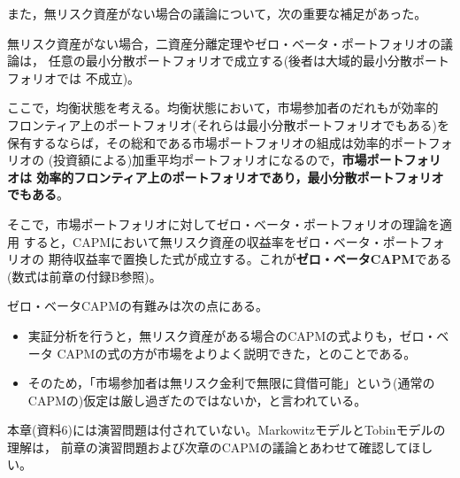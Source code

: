 また，無リスク資産がない場合の議論について，次の重要な補足があった。

\begin{keypoint}[均衡状態と市場ポートフォリオ]
無リスク資産がない場合，二資産分離定理やゼロ・ベータ・ポートフォリオの議論は，
任意の最小分散ポートフォリオで成立する(後者は大域的最小分散ポートフォリオでは
不成立)。

ここで，均衡状態を考える。均衡状態において，市場参加者のだれもが効率的
フロンティア上のポートフォリオ(それらは最小分散ポートフォリオでもある)を
保有するならば，その総和である市場ポートフォリオの組成は効率的ポートフォリオの
(投資額による)加重平均ポートフォリオになるので，\textbf{市場ポートフォリオは
効率的フロンティア上のポートフォリオであり，最小分散ポートフォリオでもある}。
\end{keypoint}

そこで，市場ポートフォリオに対してゼロ・ベータ・ポートフォリオの理論を適用
すると，CAPMにおいて無リスク資産の収益率をゼロ・ベータ・ポートフォリオの
期待収益率で置換した式が成立する。これが\textbf{ゼロ・ベータCAPM}である
(数式は前章の付録B参照)。

ゼロ・ベータCAPMの有難みは次の点にある。
\begin{itemize}
\item 実証分析を行うと，無リスク資産がある場合のCAPMの式よりも，ゼロ・ベータ
CAPMの式の方が市場をよりよく説明できた，とのことである。
\item そのため，「市場参加者は無リスク金利で無限に貸借可能」という(通常の
CAPMの)仮定は厳し過ぎたのではないか，と言われている。
\end{itemize}

\begin{remark}
本章(資料6)には演習問題は付されていない。MarkowitzモデルとTobinモデルの理解は，
前章の演習問題および次章のCAPMの議論とあわせて確認してほしい。
\end{remark}
